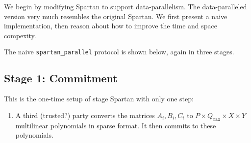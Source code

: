 \documentclass{article}
\newcommand{\red}[1] {\color{red}#1\color{black}}
\newcommand{\code}{\texttt}
\newcommand{\Qmax}{Q_{\mathtt{max}}}
\begin{document}
We begin by modifying Spartan to support data-parallelism. The data-paralleled version very much resembles the original Spartan. We first present a naive implementation, then reason about how to improve the time and space compexity.

The naive \code{spartan\_parallel} protocol is shown below, again in three stages.
\subsection{Stage 1: Commitment}\label{stage:commitment}
This is the one-time setup of stage Spartan with only one step:
\begin{enumerate}
    \item A third (\red{trusted?}) party converts the matrices $A_i, B_i, C_i$ to $P\times \Qmax \times X\times Y$ multilinear polynomials in sparse format. It then commits to these polynomials.
\end{enumerate}
\end{document}

